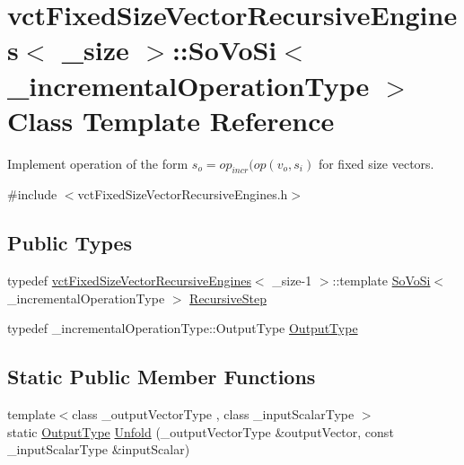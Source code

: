\hypertarget{classvct_fixed_size_vector_recursive_engines_1_1_so_vo_si}{}\section{vct\+Fixed\+Size\+Vector\+Recursive\+Engines$<$ \+\_\+size $>$\+:\+:So\+Vo\+Si$<$ \+\_\+incremental\+Operation\+Type $>$ Class Template Reference}
\label{classvct_fixed_size_vector_recursive_engines_1_1_so_vo_si}


Implement operation of the form $s_o = op_{incr}(op(v_o, s_i)$ for fixed size vectors.  




{\ttfamily \#include $<$vct\+Fixed\+Size\+Vector\+Recursive\+Engines.\+h$>$}

\subsection*{Public Types}
\begin{DoxyCompactItemize}
\item 
typedef \hyperlink{classvct_fixed_size_vector_recursive_engines}{vct\+Fixed\+Size\+Vector\+Recursive\+Engines}$<$ \+\_\+size-\/1 $>$\+::template \hyperlink{classvct_fixed_size_vector_recursive_engines_1_1_so_vo_si}{So\+Vo\+Si}$<$ \+\_\+incremental\+Operation\+Type $>$ \hyperlink{classvct_fixed_size_vector_recursive_engines_1_1_so_vo_si_ab2cd530a2ba5ab1e525322aa03a14620}{Recursive\+Step}
\item 
typedef \+\_\+incremental\+Operation\+Type\+::\+Output\+Type \hyperlink{classvct_fixed_size_vector_recursive_engines_1_1_so_vo_si_abbe36310e19f37465a117598a680abe5}{Output\+Type}
\end{DoxyCompactItemize}
\subsection*{Static Public Member Functions}
\begin{DoxyCompactItemize}
\item 
{\footnotesize template$<$class \+\_\+output\+Vector\+Type , class \+\_\+input\+Scalar\+Type $>$ }\\static \hyperlink{classvct_fixed_size_vector_recursive_engines_1_1_so_vo_si_abbe36310e19f37465a117598a680abe5}{Output\+Type} \hyperlink{classvct_fixed_size_vector_recursive_engines_1_1_so_vo_si_a053a9f378611c29bc9b339addcae401f}{Unfold} (\+\_\+output\+Vector\+Type \&output\+Vector, const \+\_\+input\+Scalar\+Type \&input\+Scalar)
\end{DoxyCompactItemize}


